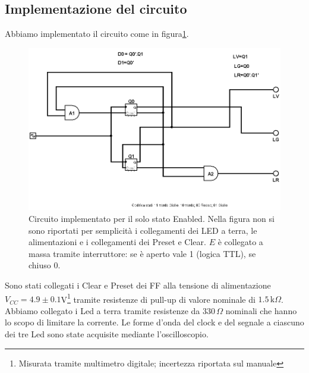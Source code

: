 \documentclass[10pt,a4paper]{article}
\begin{document}
\subsection{Implementazione del circuito}
Abbiamo implementato il circuito come in figura\ref{fig:circenable}.
\begin{figure}[!htb]
\centering
\includegraphics[scale=0.5]{circenable.png}
\caption{Circuito implementato per il solo stato Enabled. Nella figura non si sono riportati per semplicità i collegamenti dei LED a terra, le alimentazioni e i collegamenti dei Preset e Clear. $E$ è collegato a massa tramite interruttore: se è aperto vale 1 (logica TTL), se chiuso 0.\label{fig:circenable}}
\end{figure}
Sono stati collegati i Clear e Preset dei FF alla tensione di alimentazione $V_{CC} = 4.9\pm0.1 $V\footnote{Misurata tramite multimetro digitale; incertezza riportata sul manuale} tramite resistenze di pull-up di valore nominale di $1.5\,\mbox{k}\Omega$. Abbiamo collegato i Led a terra tramite resistenze da $330\,\Omega$ nominali che hanno lo scopo di limitare la corrente.
Le forme d'onda del clock e del segnale a ciascuno dei tre Led sono state acquisite mediante l'oscilloscopio.
\end{document}

